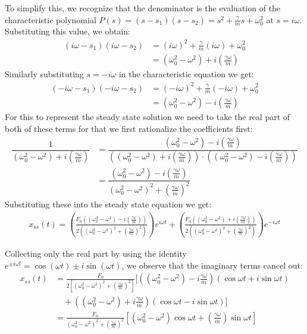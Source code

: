 \documentclass[10pt,twoside]{report}
\begin{document}
To simplify this, we recognize that the denominator is the evaluation of the characteristic polynomial $P(s) = (s - s_1)(s - s_2) = s^2 + \frac{\gamma}{m}s + \omega_0^2$ at $s = i\omega$. Substituting this value, we obtain:
\begin{align*}
    (i\omega - s_1)(i\omega - s_2) &= (i\omega)^2 + \frac{\gamma}{m}(i\omega) + \omega_0^2 \\
    &= (\omega_0^2 - \omega^2) + i\left(\frac{\gamma \omega}{m}\right)
\end{align*}
Similarly substituting $s=-i\omega$ in the characteristic equation we get:
\begin{align*}
    (-i\omega - s_1)(-i\omega - s_2) &= (-i\omega)^2 + \frac{\gamma}{m}(-i\omega) + \omega_0^2 \\
    &= (\omega_0^2 - \omega^2) - i\left(\frac{\gamma \omega}{m}\right)
\end{align*}
For this to represent the steady state solution we need to take the real part of both of these terms for that we first rationalize the coefficients first:
\begin{align*}
    \dfrac{1}{(\omega_0^2 - \omega^2) + i\left(\frac{\gamma \omega}{m}\right)} &=\dfrac{(\omega_0^2 - \omega^2) - i\left(\frac{\gamma \omega}{m}\right)}{\left((\omega_0^2 - \omega^2) + i\left(\frac{\gamma \omega}{m}\right)\right)\cdot\left((\omega_0^2 - \omega^2) - i\left(\frac{\gamma \omega}{m}\right)\right)} \\
    &=\dfrac{(\omega_0^2 - \omega^2) - i\left(\frac{\gamma \omega}{m}\right)}{(\omega_0^2 - \omega^2)^2+\left(\frac{\gamma \omega}{m}\right)^2}
\end{align*}
Substituting these into the steady state equation we get:
\begin{align*}
 x_{ss}(t) = \left(\frac{F_0\left((\omega_0^2 - \omega^2) - i\left(\frac{\gamma \omega}{m}\right)\right)}{
 2\left((\omega_0^2 - \omega^2)^2+\left(\frac{\gamma \omega}{m}\right)^2\right)}\right)e^{i\omega t} + \left(\frac{F_0\left((\omega_0^2 - \omega^2) + i\left(\frac{\gamma \omega}{m}\right)\right)}{2\left((\omega_0^2 - \omega^2)^2+\left(\frac{\gamma \omega}{m}\right)^2\right)}\right)e^{-i\omega t}
\end{align*}

Collecting only the real part by using the identity $e^{\pm i\omega t} = \cos(\omega t) \pm i \sin(\omega t)$, we observe that the imaginary terms cancel out:
\begin{align*}
 x_{ss}(t) &= \frac{F_0}{2\left[(\omega_0^2 - \omega^2)^2+\left(\frac{\gamma \omega}{m}\right)^2\right]} \Bigg[ \left( (\omega_0^2 - \omega^2) - i\frac{\gamma \omega}{m} \right) (\cos\omega t + i\sin\omega t) \\
 &\quad + \left( (\omega_0^2 - \omega^2) + i\frac{\gamma \omega}{m} \right) (\cos\omega t - i\sin\omega t) \Bigg] \\[10pt]
 &= \frac{F_0}{(\omega_0^2 - \omega^2)^2+\left(\frac{\gamma \omega}{m}\right)^2} \left[ (\omega_0^2 - \omega^2)\cos\omega t + \left(\frac{\gamma \omega}{m}\right)\sin\omega t \right]
\end{align*}
\end{document}
